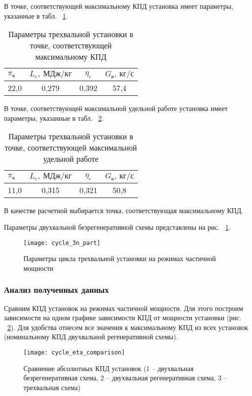 В точке, соответствующей максимальному КПД установка имеет параметры, указанные в табл. ~\ref{tab:cycle_3n_max_eta}.

\begin{longtable}{|p{7cm}|c|c|c|}
	\caption{Параметры трехвальной установки в точке, соответствующей максимальному КПД} 
	\label{tab:cycle_3n_max_eta}
	\hline
	\textbf{$\pi_к$} & \textbf{$L_e, \ МДж/кг$} & \textbf{$\eta_e$} & \textbf{$G_в, \ кг/с$} \\ \hline
	22,0 & 0,279 & 0,392 & 57,4 \\ \hline
\end{longtable}


В точке, соответствующей максимальной удельной работе установка имеет параметры, указанные в табл. ~\ref{tab:cycle_3n_max_labour}.
\begin{longtable}{|p{7cm}|c|c|c|}
	\caption{Параметры трехвальной установки в точке, соответствующей максимальной удельной работе} 
	\label{tab:cycle_3n_max_labour}
	\hline
	\textbf{$\pi_к$} & \textbf{$L_e, \ МДж/кг$} & \textbf{$\eta_e$} & \textbf{$G_в, \ кг/с$} \\ \hline
	11,0 & 0,315 & 0,321 & 50,8 \\ \hline
\end{longtable}

В качестве расчетной выбирается точка, соответствующая максимальному КПД.

Параметры двухвальной безрегенеративной схемы представлены на рис. ~\ref{img:cycle_3n_part}.

\begin{figure}[H]
    \centering
    \texttt{[image: cycle\_3n\_part]}
    \caption{Параметры цикла трехвальной установки на режимах частичной мощности}
    \label{img:cycle_3n_part}
\end{figure}

\subsubsection{Анализ полученных данных}
Сравним КПД установок на режимах частичной мощности. Для этого построим зависимости на одном графике зависимости КПД от мощности установки (рис. ~\ref{img:cycle_eta_comparison}). Для удобства отнесем все значения к максимальному КПД из всех установок (номинальному КПД двухвальной регенеративной схемы).

\begin{figure}[H]
    \centering
    \texttt{[image: cycle\_eta\_comparison]}
    \caption{Сравнение абсолютных КПД установок (1 – двухвальная безрегенеративная схема, 2 – двухвальная регенеративная схема, 3 – трехвальная схема)}
    \label{img:cycle_eta_comparison}
\end{figure}

